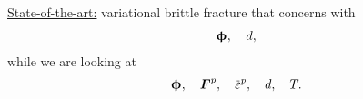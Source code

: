 \begin{frame}
\begin{columns}
\begin{column}{0.4\textwidth}
\begin{itemize}
      \end{itemize}
      \pause
      \begin{block}{}
        \underline{State-of-the-art:} variational brittle fracture that concerns with
        \begin{align*}
          \boldsymbol{\upphi}, \quad d,
        \end{align*}
        while we are looking at
        \begin{align*}
          \bs{\upphi}, \quad \defgrad^p, \quad \ep, \quad d, \quad T.
        \end{align*}
      \end{block}
    \end{column}
  \end{columns}
\end{frame}


